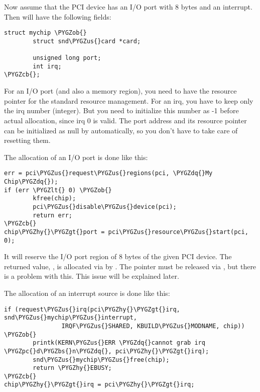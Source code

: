 \documentclass[a4paper,8pt,english]{sphinxmanual}
\def\PYGZbs{\char`\\}
\def\PYGZus{\char`\_}
\def\PYGZob{\char`\{}
\def\PYGZcb{\char`\}}
\def\PYGZlt{\char`\<}
\def\PYGZgt{\char`\>}
\def\PYGZpc{\char`\%}
\def\PYGZhy{\char`\-}
\def\PYGZdq{\char`\"}
\begin{document}
Now assume that the PCI device has an I/O port with 8 bytes and an
interrupt. Then  will have the
following fields:

\begin{Verbatim}[commandchars=\\\{\}]
struct mychip \PYGZob{}
        struct snd\PYGZus{}card *card;

        unsigned long port;
        int irq;
\PYGZcb{};
\end{Verbatim}

For an I/O port (and also a memory region), you need to have the
resource pointer for the standard resource management. For an irq, you
have to keep only the irq number (integer). But you need to initialize
this number as -1 before actual allocation, since irq 0 is valid. The
port address and its resource pointer can be initialized as null by
 automatically, so you don't have to take care of
resetting them.

The allocation of an I/O port is done like this:

\begin{Verbatim}[commandchars=\\\{\}]
err = pci\PYGZus{}request\PYGZus{}regions(pci, \PYGZdq{}My Chip\PYGZdq{});
if (err \PYGZlt{} 0) \PYGZob{}
        kfree(chip);
        pci\PYGZus{}disable\PYGZus{}device(pci);
        return err;
\PYGZcb{}
chip\PYGZhy{}\PYGZgt{}port = pci\PYGZus{}resource\PYGZus{}start(pci, 0);
\end{Verbatim}

It will reserve the I/O port region of 8 bytes of the given PCI device.
The returned value, , is allocated via
 by . The pointer
must be released via , but there is a problem with
this. This issue will be explained later.

The allocation of an interrupt source is done like this:

\begin{Verbatim}[commandchars=\\\{\}]
if (request\PYGZus{}irq(pci\PYGZhy{}\PYGZgt{}irq, snd\PYGZus{}mychip\PYGZus{}interrupt,
                IRQF\PYGZus{}SHARED, KBUILD\PYGZus{}MODNAME, chip)) \PYGZob{}
        printk(KERN\PYGZus{}ERR \PYGZdq{}cannot grab irq \PYGZpc{}d\PYGZbs{}n\PYGZdq{}, pci\PYGZhy{}\PYGZgt{}irq);
        snd\PYGZus{}mychip\PYGZus{}free(chip);
        return \PYGZhy{}EBUSY;
\PYGZcb{}
chip\PYGZhy{}\PYGZgt{}irq = pci\PYGZhy{}\PYGZgt{}irq;
\end{Verbatim}
\end{document}
